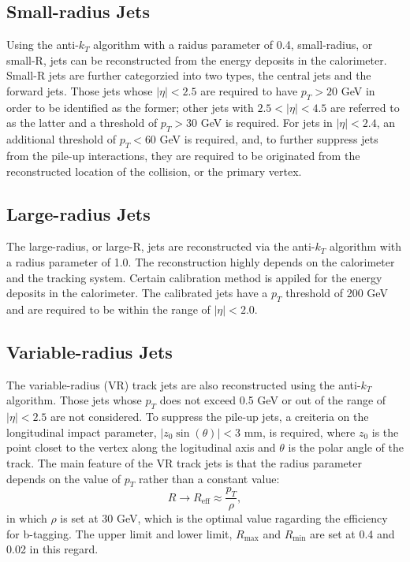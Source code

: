 \documentclass[class=NCU_thesis, crop=false]{standalone}
\begin{document}
	\subsection{Small-radius Jets}
		Using the anti-$k_T$ algorithm with a raidus parameter of 0.4, small-radius, or small-R, jets can be reconstructed from the energy deposits in the calorimeter. Small-R jets are further categorzied into two types, the central jets and the forward jets. Those jets whose $\lvert \eta \rvert < 2.5$ are required to have $p_T > 20$ GeV in order to be identified as the former; other jets with $2.5 < \lvert \eta \rvert < 4.5$ are referred to as the latter and a threshold of $p_T > 30$ GeV is required. For jets in $\lvert \eta \rvert < 2.4$, an additional threshold of $p_T < 60$ GeV is required, and, to further suppress jets from the pile-up interactions, they are required to be originated from the reconstructed location of the collision, or the primary vertex.
	
	\subsection{Large-radius Jets}
		The large-radius, or large-R, jets are reconstructed via the anti-$k_T$ algorithm with a radius parameter of 1.0. The reconstruction highly depends on the calorimeter and the tracking system. Certain calibration method is appiled for the energy deposits in the calorimeter. The calibrated jets have a $p_T$ threshold of 200 GeV and are required to be within the range of $\lvert \eta \rvert < 2.0$.
	
	\subsection{Variable-radius Jets}
		The variable-radius (VR) track jets are also reconstructed using the anti-$k_T$ algorithm. Those jets whose $p_T$ does not exceed 0.5 GeV or out of the range of $\lvert \eta \rvert < 2.5$ are not considered. To suppress the pile-up jets, a creiteria on the longitudinal impact parameter, $\lvert z_0 \sin(\theta) \rvert < 3$ mm, is required, where $z_0$ is the point closet to the vertex along the logitudinal axis and $\theta$ is the polar angle of the track. The main feature of the VR track jets is that the radius parameter depends on the value of $p_T$ rather than a constant value:
		\begin{equation}
			R \rightarrow R_{\mathrm{eff}} \approx \frac{p_T}{\rho},
		\end{equation}
		in which $\rho$ is set at 30 GeV, which is the optimal value ragarding the efficiency for b-tagging. The upper limit and lower limit, $R_{\mathrm{max}}$ and $R_{\mathrm{min}}$ are set at 0.4 and 0.02 in this regard.
	
\end{document}
